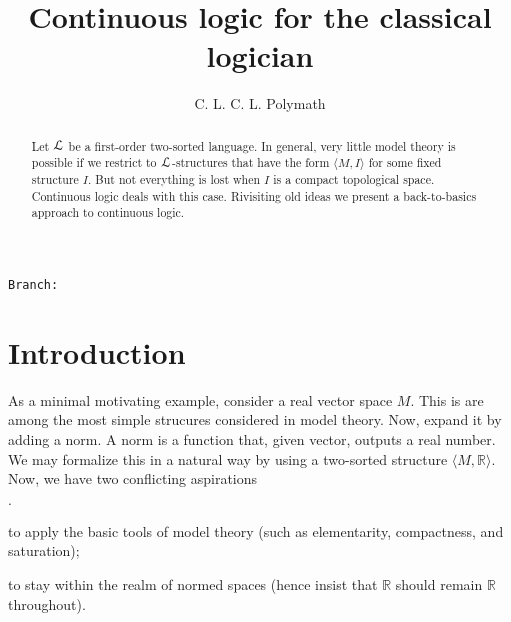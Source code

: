 \documentclass[10pt,oneside]{amsproc}
\author{C. L. C. L. Polymath}
\newcommand{\mylabel}[1]{{#1}\hfill}
\renewenvironment{itemize}
  {\begin{list}{$\cdot$}{%
  \setlength{\parskip}{0mm}
  \setlength{\topsep}{.4\baselineskip}
  \setlength{\rightmargin}{0mm}
  \setlength{\listparindent}{0mm}
  \setlength{\itemindent}{0mm}
  \setlength{\labelwidth}{3ex}
  \setlength{\itemsep}{.2\baselineskip}
  \setlength{\parsep}{.2\baselineskip}
  \setlength{\partopsep}{0mm}
  \setlength{\labelsep}{1ex}
  \setlength{\leftmargin}{\labelwidth+\labelsep}
  \let\makelabel\mylabel}}{%
\end{list}}
\newcommand\branch{}
\begin{document}
\title{Continuous logic for the classical logician}
\hfill\texttt{Branch:\ \branch\ \DTMnow}\bigskip
\maketitle
\raggedbottom

\begin{abstract}
  Let ${\EuScript L}$ be a first-order two-sorted language.
  In general, very little model theory is possible if we restrict to ${\EuScript L}$-structures that have the form $\langle M,I\rangle$ for some fixed structure $I$.
  But not everything is lost when $I$ is a compact topological space.
  Continuous logic deals with this case.
  Rivisiting old ideas we present a back-to-basics approach to continuous logic.
\end{abstract}
\section{Introduction}\label{intro}


\def\ceq#1#2#3{\parbox[t]{23ex}{$\displaystyle #1$}\parbox{6ex}{\hfil $#2$}{$\displaystyle #3$}}

As a minimal motivating example, consider a real vector space $M$.
This is are among the most simple strucures considered in model theory.
Now, expand it by adding a norm.
A norm is a function that, given vector, outputs a real number.
We may formalize this in a natural way by using a two-sorted structure $\langle M,\mathds{R}\rangle$.
Now, we have two conflicting aspirations
\begin{itemize}
  \item[i.] to apply the basic tools of model theory (such as elementarity, compactness, and saturation);
  \item[ii.] to stay within the realm of normed spaces (hence insist that 
  $\mathds{R}$ should remain $\mathds{R}$ throughout).
\end{itemize}
\end{document}
